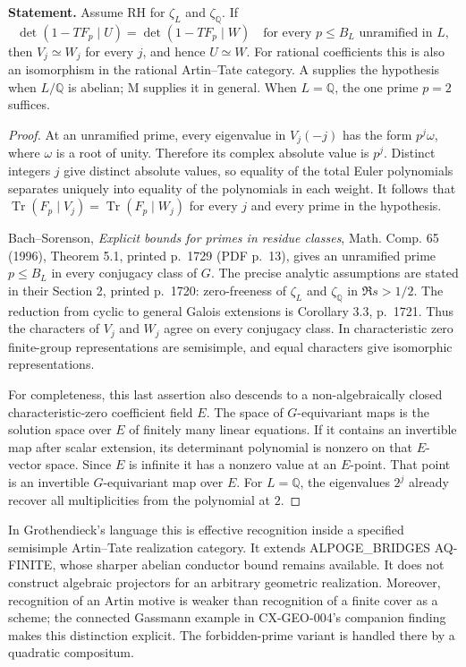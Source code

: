 \documentclass[11pt,a4paper]{article}
\begin{document}
\textbf{Statement.} Assume RH for $\zeta_L$ and $\zeta_{\mathbb Q}$.
If
\[
 \det(1-TF_p\mid U)=\det(1-TF_p\mid W)
 \quad\text{for every }p\le B_L\text{ unramified in }L,
\]
then $V_j\simeq W_j$ for every $j$, and hence $U\simeq W$.
For rational coefficients this is also an isomorphism in the rational
Artin--Tate category. A supplies the hypothesis when $L/\mathbb Q$ is
abelian; M supplies it in general. When $L=\mathbb Q$, the one prime $p=2$
suffices.

\begin{proof}
At an unramified prime, every eigenvalue in $V_j(-j)$ has the form
$p^j\omega$, where $\omega$ is a root of unity. Therefore its complex
absolute value is $p^j$. Distinct integers $j$ give distinct absolute
values, so equality of the total Euler polynomials separates uniquely into
equality of the polynomials in each weight. It follows that
$\operatorname{Tr}(F_p\mid V_j)=\operatorname{Tr}(F_p\mid W_j)$ for every
$j$ and every prime in the hypothesis.

Bach--Sorenson, \emph{Explicit bounds for primes in residue classes},
Math. Comp. 65 (1996), Theorem 5.1, printed p.~1729 (PDF p.~13), gives
an unramified prime $p\le B_L$ in every conjugacy class of $G$.
The precise analytic assumptions are stated in their Section 2,
printed p.~1720: zero-freeness of $\zeta_L$ and $\zeta_{\mathbb Q}$ in
$\Re s>1/2$. The reduction from cyclic to general Galois extensions is
Corollary 3.3, p.~1721. Thus the characters of $V_j$ and $W_j$ agree on
every conjugacy class. In characteristic zero finite-group representations
are semisimple, and equal characters give isomorphic representations.

For completeness, this last assertion also descends to a non-algebraically
closed characteristic-zero coefficient field $E$. The space of
$G$-equivariant maps is the solution space over $E$ of finitely many linear
equations. If it contains an invertible map after scalar extension, its
determinant polynomial is nonzero on that $E$-vector space. Since $E$ is
infinite it has a nonzero value at an $E$-point. That point is an invertible
$G$-equivariant map over $E$. For $L=\mathbb Q$, the eigenvalues $2^j$
already recover all multiplicities from the polynomial at $2$.
\end{proof}

In Grothendieck's language this is effective recognition inside a specified
semisimple Artin--Tate realization category. It extends
ALPOGE\_BRIDGES AQ-FINITE, whose sharper abelian conductor bound remains
available. It does not construct algebraic projectors for an arbitrary
geometric realization. Moreover, recognition of an Artin motive is weaker
than recognition of a finite cover as a scheme; the connected Gassmann
example in CX-GEO-004's companion finding makes this distinction explicit.
The forbidden-prime variant is handled there by a quadratic compositum.
\end{document}
